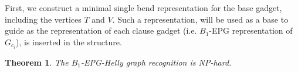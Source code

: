 \documentclass[a4paper,11pt]{article}
\newtheorem{theorem}{Theorem}
\begin{document}




First, we construct a minimal single bend representation for the base gadget, including the vertices $T$ and $V$. Such a representation, will be used as a base to guide as the representation of each clause gadget (i.e. $B_1$-EPG representation of $G_{c_i}$), is inserted in the structure. %




\begin{theorem}
The $B_{1}$-EPG-Helly graph recognition is NP-hard.
\end{theorem}
\end{document}
